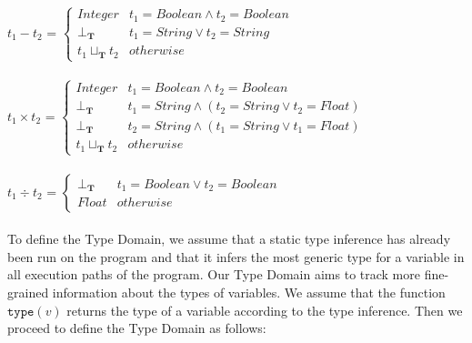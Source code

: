 \documentclass[10pt]{report}
\begin{document}
\hspace*{10mm}$ t_{1} - t_{2}$ = $ \left\{
\begin{array}{ll}
Integer & t_{1} = Boolean \wedge t_{2} = Boolean \\
\bot_{\mathbf{T}} & t_{1} = String \vee  t_{2} = String \\
t_{1} \sqcup_{\mathbf{T}} t_{2} & otherwise
\end{array} 
\right. $ \\ \\

\hspace*{10mm}$ t_{1} \times t_{2}$ = $ \left\{
\begin{array}{ll}
Integer & t_{1} = Boolean \wedge t_{2} = Boolean \\
\bot_{\mathbf{T}} & t_{1} = String \wedge  (t_{2} = String \vee t_{2} = Float) \\
\bot_{\mathbf{T}} & t_{2} = String \wedge  (t_{1} = String \vee t_{1} = Float) \\
t_{1} \sqcup_{\mathbf{T}} t_{2} & otherwise
\end{array} 
\right. $ \\ \\

\hspace*{10mm}$ t_{1} \div t_{2}$ = $ \left\{
\begin{array}{ll}
 \bot_{\mathbf{T}} & t_{1} = Boolean \vee t_{2} = Boolean \\
	Float & otherwise
\end{array} 
\right. $ \\ \\
 
To define the Type Domain, we assume that a static type inference has already been run on the program and that it infers the most generic type for a variable in all execution paths of the program. Our Type Domain aims to track more fine-grained information about the types of variables. We assume that the function $ \mathtt{type}(v) $ returns the type of a variable according to the type inference. Then we proceed to define the Type Domain as follows: 
\end{document}
